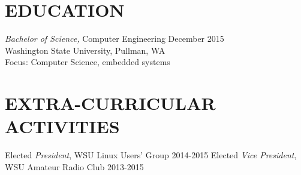 \documentclass[line, margin]{res}
\begin{document}
\begin{resume}
\section{EDUCATION} {\sl Bachelor of Science,} Computer Engineering \hfill December 2015 \\
                Washington State University, Pullman, WA\\
                Focus: Computer Science, embedded systems
 

\section{EXTRA-CURRICULAR \\ ACTIVITIES}             
            Elected {\it President}, WSU Linux Users' Group \hfill 2014-2015
            Elected {\it Vice President}, WSU Amateur Radio Club \hfill 2013-2015


\end{resume}
\end{document}
